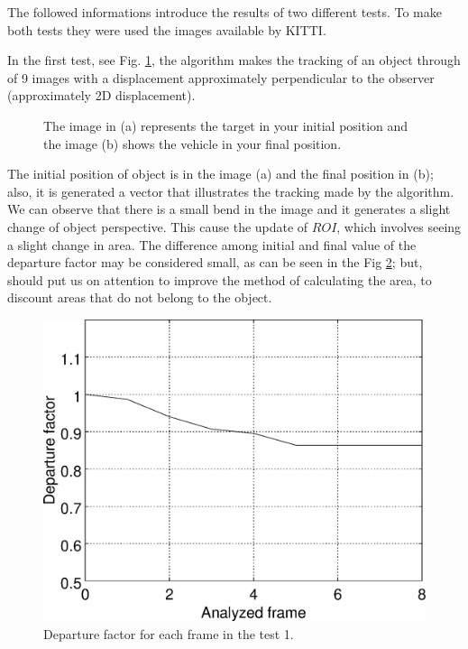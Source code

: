 The followed informations introduce the results of two different tests. 
To make both tests they were used the images available by KITTI\cite{Geiger}.


In the first test, see Fig. \ref{fig:imgpapercerta}, 
the algorithm makes the tracking of an object through of 9 images with 
a displacement approximately perpendicular to the observer (approximately 2D displacement).
\begin{figure}[!hbt]
\centering
  \caption{The image in (a) represents the target in your initial position 
   and the image (b) shows the vehicle in your final position.}
  \label{fig:imgpapercerta}
\end{figure}
The initial position of object is in the image (a) and the final position in (b); 
also, it is generated a vector that  illustrates the tracking made by the algorithm.
We can observe that there is a small bend in the image 
and it generates a slight change of object perspective. 
This cause the update of $ROI$, which involves seeing a slight change in area.
The difference among initial and final value of the departure factor may 
be considered small, as can be seen in the Fig \ref{fig:res_graph1};
but, should put us on attention to improve the method of calculating the area,
to discount areas that do not belong to the object.
\begin{figure}[!hbt]
\centering
\includegraphics[width=0.8\columnwidth]{images/graph1.eps}
\caption{Departure factor for each frame in the test 1.}
\label{fig:res_graph1}
\end{figure}
